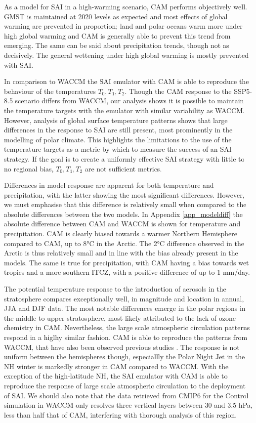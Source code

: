 As a model for SAI in a high-warming scenario, CAM performs objectively well. GMST is maintained at 2020 levels as expected and most effects of global warming are prevented in proportion; land and polar oceans warm more under high global warming and CAM is generally able to prevent this trend from emerging. The same can be said about precipitation trends, though not as decisively. The general wettening under high global warming is mostly prevented with SAI. 

In comparison to WACCM the SAI emulator with CAM is able to reproduce the behaviour of the temperatures $T_0, T_1, T_2$. Though the CAM response to the SSP5-8.5 scenario differs from WACCM, our analysis shows it is possible to maintain the temperature targets with the emulator with similar variability as WACCM. However, analysis of global surface temperature patterns shows that large differences in the response to SAI are still present, most prominently in the modelling of polar climate. This highlights the limitations to the use of the temperature targets as a metric by which to measure the success of an SAI strategy. If the goal is to create a uniformly effective SAI strategy with little to no regional bias, $T_0, T_1, T_2$ are not sufficient metrics.

Differences in model response are apparent for both temperature and precipitation, with the latter showing the most significant differences. However, we must emphasise that this difference is relatively small when compared to the absolute differences between the two models. In Appendix \ref{app_modeldiff} the absolute difference between CAM and WACCM is shown for temperature and precipitation. CAM is clearly biased towards a warmer Northern Hemisphere compared to CAM, up to 8°C in the Arctic. The 2°C difference observed in the Arctic is thus relatively small and in line with the bias already present in the models. The same is true for precipitation, with CAM having a bias towards wet tropics and a more southern ITCZ, with a positive difference of up to 1 mm/day. 

The potential temperature response to the introduction of aerosols in the stratosphere compares exceptionally well, in magnitude and location in annual, JJA and DJF data. The most notable differences emerge in the polar regions in the middle to upper stratosphere, most likely attributed to the lack of ozone chemistry in CAM. Nevertheless, the large scale atmospheric circulation patterns respond in a higlhy similar fashion. CAM is able to reproduce the patterns from WACCM, that have also been observed previous studies \parencite{bednarz2023climate}. The response is not uniform between the hemispheres though, especiallly the Polar Night Jet in the NH winter is markedly stronger in CAM compared to WACCM. With the exception of the high-latitude NH, the SAI emulator with CAM is able to reproduce the response of large scale atmospheric circulation to the deployment of SAI. We should also note that the data retrieved from CMIP6 for the Control simulation in WACCM only resolves three vertical layers between 30 and 3.5 hPa, less than half that of CAM, interfering with thorough analysis of this region. 

